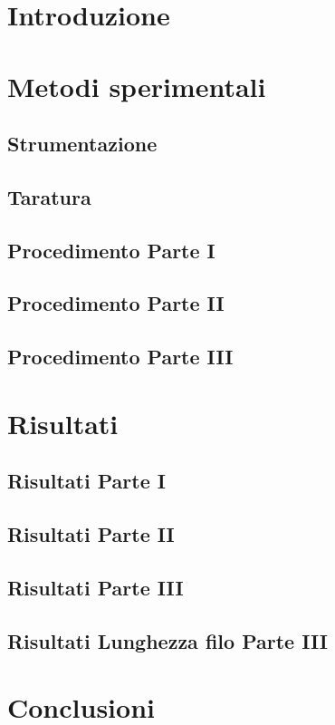 \documentclass[a4paper,10pt,oneside]{memoir}
\begin{document}
\tableofcontents*

\newpage
\normalsize
{}
\section{Introduzione}
 

\section{Metodi sperimentali}
\subsection{Strumentazione}

\subsection{Taratura}

\subsection{Procedimento Parte I}

\subsection{Procedimento Parte II}


\subsection{Procedimento Parte III}

\newpage
\section{Risultati}
\subsection{Risultati Parte I}\label{sec:risultati 1}


\subsection{Risultati Parte II}


\subsection{Risultati Parte III}

\newpage
\subsection{Risultati Lunghezza filo Parte III}

\section{Conclusioni}

\end{document}

